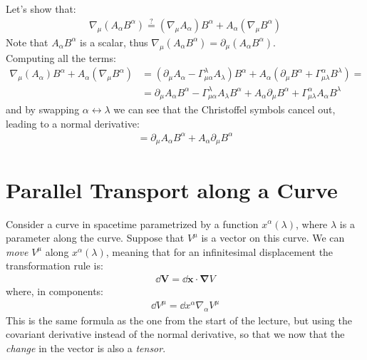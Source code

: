 \documentclass[../template.tex]{subfiles}
\begin{document}
\begin{example}
    Let's show that:
    \begin{align*}
        \nabla_\mu (A_\alpha B^\alpha) \overset{?}{=} (\nabla_\mu A_\alpha) B^\alpha + A_\alpha (\nabla_\mu B^\alpha)
    \end{align*}
    Note that $A_\alpha B^\alpha$ is a scalar, thus $\nabla_\mu (A_\alpha B^\alpha) = \partial_\mu (A_\alpha B^\alpha)$.\\
    Computing all the terms:
    \begin{align*}
        \nabla_\mu(A_\alpha)B^\alpha + A_\alpha (\nabla_\mu B^\alpha) &= (\partial_\mu A_\alpha - \Gamma^\lambda_{\mu \alpha} A_\lambda) B^\alpha + A_\alpha (\partial_\mu B^\alpha + \Gamma^\alpha_{\mu \lambda} B^\lambda) =\\
        &=\partial_\mu A_\alpha B^\alpha - \Gamma^\lambda_{\mu \alpha} A_\lambda B^\alpha + A_\alpha \partial_\mu B^\alpha + \Gamma^\alpha_{\mu \lambda} A_\alpha B^\lambda
    \end{align*}
    and by swapping $\alpha \leftrightarrow \lambda$ we can see that the Christoffel symbols cancel out, leading to a normal derivative:
    \begin{align*}
        = \partial_\mu A_\alpha B^\alpha + A_\alpha \partial_\mu B^\alpha
    \end{align*} 
\end{example}

\section{Parallel Transport along a Curve}
Consider a curve in spacetime parametrized by a function $x^\alpha(\lambda)$, where $\lambda$ is a parameter along the curve. Suppose that $V^\mu$ is a vector on this curve. We can \textit{move} $V^\mu$ along $x^\alpha(\lambda)$, meaning that for an infinitesimal displacement the transformation rule is:
\begin{align*}
    \dd{\bm{V}} = \dd{\bm{x}} \cdot \bm{\nabla}V
\end{align*}
where, in components:
\begin{align*}
    \dd{V^\mu} = \dd{x^\alpha} \nabla_\alpha V^\mu
\end{align*}
This is the same formula as the one from the start of the lecture, but using the covariant derivative instead of the normal derivative, so that we now that the \textit{change} in the vector is also a \textit{tensor}.\\
\end{document}
